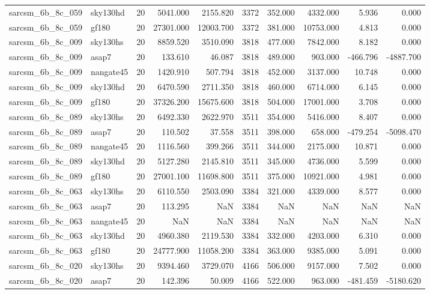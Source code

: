\documentclass{article}
\begin{document}
\begin{longtable}{llrrrrrrrr}
sarcsm\_6b\_8c\_059 & sky130hd & 20 & 5041.000 & 2155.820 & 3372 & 352.000 & 4332.000 & 5.936 & 0.000 \\
sarcsm\_6b\_8c\_059 & gf180 & 20 & 27301.000 & 12003.700 & 3372 & 381.000 & 10753.000 & 4.813 & 0.000 \\
sarcsm\_6b\_8c\_009 & sky130hs & 20 & 8859.520 & 3510.090 & 3818 & 477.000 & 7842.000 & 8.182 & 0.000 \\
sarcsm\_6b\_8c\_009 & asap7 & 20 & 133.610 & 46.087 & 3818 & 489.000 & 903.000 & -466.796 & -4887.700 \\
sarcsm\_6b\_8c\_009 & nangate45 & 20 & 1420.910 & 507.794 & 3818 & 452.000 & 3137.000 & 10.748 & 0.000 \\
sarcsm\_6b\_8c\_009 & sky130hd & 20 & 6470.590 & 2711.350 & 3818 & 460.000 & 6714.000 & 6.145 & 0.000 \\
sarcsm\_6b\_8c\_009 & gf180 & 20 & 37326.200 & 15675.600 & 3818 & 504.000 & 17001.000 & 3.708 & 0.000 \\
sarcsm\_6b\_8c\_089 & sky130hs & 20 & 6492.330 & 2622.970 & 3511 & 354.000 & 5416.000 & 8.407 & 0.000 \\
sarcsm\_6b\_8c\_089 & asap7 & 20 & 110.502 & 37.558 & 3511 & 398.000 & 658.000 & -479.254 & -5098.470 \\
sarcsm\_6b\_8c\_089 & nangate45 & 20 & 1116.560 & 399.266 & 3511 & 344.000 & 2175.000 & 10.871 & 0.000 \\
sarcsm\_6b\_8c\_089 & sky130hd & 20 & 5127.280 & 2145.810 & 3511 & 345.000 & 4736.000 & 5.599 & 0.000 \\
sarcsm\_6b\_8c\_089 & gf180 & 20 & 27001.100 & 11698.800 & 3511 & 375.000 & 10921.000 & 4.981 & 0.000 \\
sarcsm\_6b\_8c\_063 & sky130hs & 20 & 6110.550 & 2503.090 & 3384 & 321.000 & 4339.000 & 8.577 & 0.000 \\
sarcsm\_6b\_8c\_063 & asap7 & 20 & 113.295 & NaN & 3384 & NaN & NaN & NaN & NaN \\
sarcsm\_6b\_8c\_063 & nangate45 & 20 & NaN & NaN & 3384 & NaN & NaN & NaN & NaN \\
sarcsm\_6b\_8c\_063 & sky130hd & 20 & 4960.380 & 2119.530 & 3384 & 332.000 & 4203.000 & 6.310 & 0.000 \\
sarcsm\_6b\_8c\_063 & gf180 & 20 & 24777.900 & 11058.200 & 3384 & 363.000 & 9385.000 & 5.091 & 0.000 \\
sarcsm\_6b\_8c\_020 & sky130hs & 20 & 9394.460 & 3729.070 & 4166 & 506.000 & 9157.000 & 7.502 & 0.000 \\
sarcsm\_6b\_8c\_020 & asap7 & 20 & 142.396 & 50.009 & 4166 & 522.000 & 963.000 & -481.459 & -5180.620 \\

\end{longtable}
\end{document}
